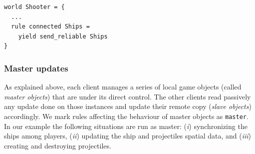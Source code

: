 \begin{lstlisting}
world Shooter = {
  ...
  rule connected Ships =
    yield send_reliable Ships
}
\end{lstlisting}


\subsubsection{Master updates}
As explained above, each client manages a series of local game objects (called \textit{master objects}) that are under its direct control. The other clients read passively any update done on those instances and update their remote copy  (\textit{slave objects}) accordingly. We mark rules affecting the behaviour of master objects as \texttt{master}. In our example the following situations are run as master: (\textit{i}) synchronizing the ships among players, (\textit{ii}) updating the ship and projectiles spatial data, and (\textit{iii}) creating and destroying projectiles.

